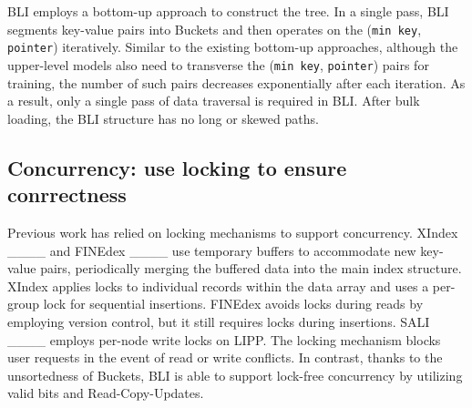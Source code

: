 BLI employs a bottom-up approach to construct the tree. In a single pass, BLI segments key-value pairs into Buckets and then operates on the (\texttt{min key}, \texttt{pointer}) iteratively. Similar to the existing bottom-up approaches, although the upper-level models also need to transverse the (\texttt{min key}, \texttt{pointer}) pairs for training, the number of such pairs decreases exponentially after each iteration. As a result, only a single pass of data traversal is required in BLI. After bulk loading, the BLI structure has no long or skewed paths.

\subsection{Concurrency: use locking to ensure conrrectness}
Previous work has relied on locking mechanisms to support concurrency. XIndex ____ and FINEdex ____ use temporary buffers to accommodate new key-value pairs, periodically merging the buffered data into the main index structure. XIndex applies locks to individual records within the data array and uses a per-group lock for sequential insertions. FINEdex avoids locks during reads by employing version control, but it still requires locks during insertions. SALI ____ employs per-node write locks on LIPP. The locking mechanism blocks user requests in the event of read or write conflicts. In contrast, thanks to the unsortedness of Buckets, BLI is able to support lock-free concurrency by utilizing valid bits and Read-Copy-Updates.